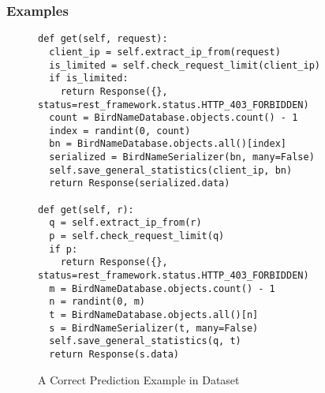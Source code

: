 \subsubsection{Examples}
\label{sec:eval-example}



\begin{figure}[t]
	\centering
	\begin{lstlisting}[]
def get(self, request):
  client_ip = self.extract_ip_from(request)
  is_limited = self.check_request_limit(client_ip)
  if is_limited:
    return Response({}, status=rest_framework.status.HTTP_403_FORBIDDEN)
  count = BirdNameDatabase.objects.count() - 1
  index = randint(0, count)
  bn = BirdNameDatabase.objects.all()[index]
  serialized = BirdNameSerializer(bn, many=False)
  self.save_general_statistics(client_ip, bn)
  return Response(serialized.data)

def get(self, r):
  q = self.extract_ip_from(r)
  p = self.check_request_limit(q)
  if p:
    return Response({}, status=rest_framework.status.HTTP_403_FORBIDDEN)
  m = BirdNameDatabase.objects.count() - 1
  n = randint(0, m)
  t = BirdNameDatabase.objects.all()[n]
  s = BirdNameSerializer(t, many=False)
  self.save_general_statistics(q, t)
  return Response(s.data)       
\end{lstlisting}
\vspace{-16pt}
\caption{A Correct Prediction Example in Dataset}
\label{example1}
\end{figure}
